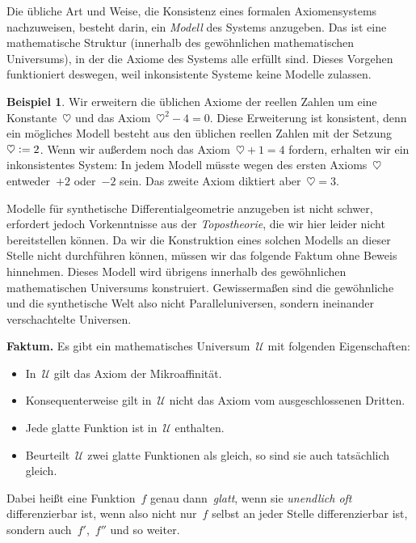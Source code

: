 \documentclass[twoside]{../zirkelblatt}
\newcommand{\U}{\mathcal{U}}
\newcommand{\defeq}{\vcentcolon=}
\theoremstyle{definition}
\newtheorem{bsp}[defn]{Beispiel}
\theoremstyle{plain}
\theoremstyle{remark}
\begin{document}
Die übliche Art und Weise, die Konsistenz eines formalen Axiomensystems
nachzuweisen, besteht darin, ein \emph{Modell} des Systems anzugeben. Das ist
eine mathematische Struktur (innerhalb des gewöhnlichen mathematischen
Universums), in der die Axiome des Systems alle erfüllt sind.
Dieses Vorgehen funktioniert deswegen, weil inkonsistente Systeme keine Modelle
zulassen.

\begin{bsp}Wir erweitern die üblichen Axiome der reellen
Zahlen um eine Konstante~$\heartsuit$ und das Axiom~$\heartsuit^2 - 4 = 0$.
Diese Erweiterung ist konsistent, denn ein mögliches Modell besteht aus den
üblichen reellen Zahlen mit der Setzung~$\heartsuit \defeq 2$. Wenn wir außerdem
noch das Axiom~$\heartsuit + 1 = 4$ fordern, erhalten wir ein inkonsistentes
System: In jedem Modell müsste wegen des ersten Axioms~$\heartsuit$
entweder~$+2$ oder~$-2$ sein. Das zweite Axiom diktiert aber~$\heartsuit =
3$.\end{bsp}

Modelle für synthetische Differentialgeometrie anzugeben ist nicht schwer,
erfordert jedoch Vorkenntnisse aus der \emph{Topostheorie}, die
wir hier leider nicht bereitstellen können. Da wir die Konstruktion eines solchen Modells
an dieser Stelle nicht durchführen können, müssen wir das folgende Faktum
ohne Beweis hinnehmen. Dieses Modell wird übrigens innerhalb des gewöhnlichen
mathematischen Universums konstruiert. Gewissermaßen sind die gewöhnliche und
die synthetische Welt also nicht Paralleluniversen, sondern ineinander
verschachtelte Universen.

\begin{shaded}
\textbf{Faktum.} Es gibt ein mathematisches Universum~$\U$ mit folgenden
Eigenschaften:
\begin{itemize}
\item In~$\U$ gilt das Axiom der Mikroaffinität.
\item Konsequenterweise gilt in~$\U$ nicht das Axiom vom ausgeschlossenen
Dritten.
\item Jede glatte Funktion ist in~$\U$ enthalten.
\item Beurteilt~$\U$ zwei glatte Funktionen als gleich, so sind sie
auch tatsächlich gleich.
\label{fact:sdg-universum}
\end{itemize}
\end{shaded}

Dabei heißt eine Funktion~$f$ genau dann~\emph{glatt}, wenn sie \emph{unendlich
oft} differenzierbar ist, wenn also nicht nur~$f$ selbst an jeder Stelle
differenzierbar ist, sondern auch~$f'$,~$f''$ und so weiter.
\end{document}
